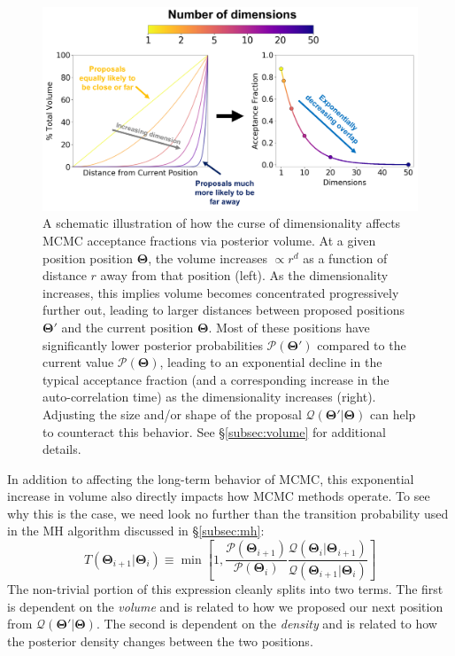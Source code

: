 \documentclass[12pt, titlepage]{article}
\newcommand{\params}{\ensuremath{\boldsymbol\Theta}}
\newcommand{\posterior}{\ensuremath{\mathcal{P}}}
\newcommand{\proposal}{\ensuremath{\mathcal{Q}}}
\begin{document}
\begin{figure}
\begin{center}
\includegraphics[width=\textwidth]{figures/fig11.png}
\end{center}
\caption{A schematic illustration of how the curse of dimensionality
affects MCMC acceptance fractions via posterior volume.
At a given position position $\params$, 
the volume increases $\propto r^d$ as a function 
of distance $r$ away from that position (left). 
As the dimensionality increases, this implies volume
becomes concentrated progressively further out, leading to 
larger distances between proposed positions $\params'$ and the current
position $\params$. Most of these positions have significantly lower
posterior probabilities $\posterior(\params')$ compared to the 
current value $\posterior(\params)$, leading to an
exponential decline in the typical acceptance fraction
(and a corresponding increase in the auto-correlation time)
as the dimensionality increases (right). Adjusting the size
and/or shape of the proposal $\proposal(\params'|\params)$
can help to counteract this behavior.
See \S\ref{subsec:volume} for additional details.
}\label{fig:vol}
\end{figure}

In addition to affecting the long-term behavior of MCMC, 
this exponential increase in volume also directly
impacts how MCMC methods operate. To see why this is the case, we
need look no further than the transition probability used in the
MH algorithm discussed in \S\ref{subsec:mh}:
\begin{equation*}
    T(\params_{i+1}|\params_i)
    \equiv \min\left[1, \frac{\posterior(\params_{i+1})}{\posterior(\params_i)}
    \frac{\proposal(\params_i|\params_{i+1})}{\proposal(\params_{i+1}|\params_i)}
    \right]
\end{equation*}
The non-trivial portion of this expression cleanly splits into two terms.
The first is dependent on the \textit{volume} and is related to
how we proposed our next position from $\proposal(\params'|\params)$.
The second is dependent on the \textit{density} and is related to
how the posterior density changes between the two positions.
\end{document}
